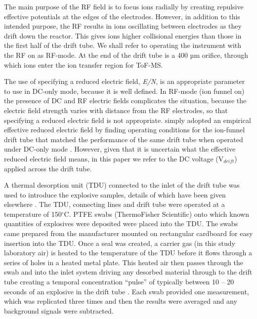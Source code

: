 The main purpose of the RF field is to focus ions radially by creating repulsive effective potentials at the edges of the electrodes. However, in addition to this intended purpose, the RF results in ions oscillating between electrodes as they drift down the reactor. This gives ions higher collisional energies than those in the first half of the drift tube. We shall refer to operating the instrument with the RF on as RF-mode. At the end of the drift tube is a 400 µm orifice, through which ions enter the ion transfer region for ToF-MS.


The use of specifying a reduced electric field, \textit{E/N}, is an appropriate parameter to use in DC-only mode, because it is well defined. In RF-mode (ion funnel on) the presence of DC and RF electric fields complicates the situation, because the electric field strength varies with distance from the RF electrodes, so that specifying a reduced electric field is not appropriate. \citeauthor{barber2012increased}  simply adopted an empirical effective reduced electric field by finding operating conditions for the ion-funnel drift tube that matched the performance of the same drift tube when operated under DC-only mode \cite{barber2012increased}. However, given that it is uncertain what the effective reduced electric field means, in this paper we refer to the DC voltage (V$_{drift}$) applied across the drift tube.

A thermal desorption unit (TDU) connected to the inlet of the drift tube was used to introduce the explosive samples, details of which have been given elsewhere \cite{RN445}. The TDU, connecting lines and drift tube were operated at a temperature of 150$^{\circ}$C. PTFE swabs (ThermoFisher Scientific) onto which known quantities of explosives were deposited were placed into the TDU. The swabs came prepared from the manufacturer mounted on rectangular cardboard for easy insertion into the TDU. Once a seal was created, a carrier gas (in this study laboratory air) is heated to the temperature of the TDU before it flows through a series of holes in a heated metal plate. This heated air then passes through the swab and into the inlet system driving any desorbed material through to the drift tube creating a temporal concentration “pulse” of typically between 10 – 20 seconds of an explosive in the drift tube \cite{RN445}. Each swab provided one measurement, which was replicated three times and then the results were averaged and any background signals were subtracted. 

